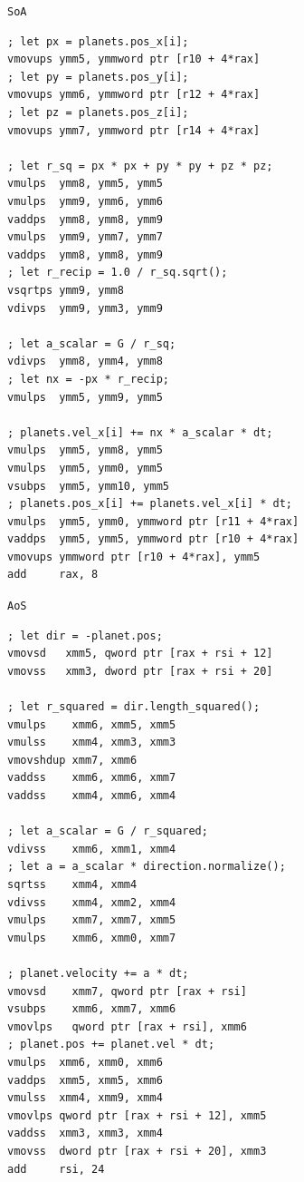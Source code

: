 \begin{figure}[htbp]
\centering
\begin{minipage}[t]{0.42\linewidth}
\centering\texttt{SoA}\par\smallskip
\begin{lstlisting}[language={[x86masm]Assembler}, basicstyle=\scriptsize\ttfamily]
; let px = planets.pos_x[i];
vmovups ymm5, ymmword ptr [r10 + 4*rax]
; let py = planets.pos_y[i];
vmovups ymm6, ymmword ptr [r12 + 4*rax]
; let pz = planets.pos_z[i];
vmovups ymm7, ymmword ptr [r14 + 4*rax]

; let r_sq = px * px + py * py + pz * pz;
vmulps  ymm8, ymm5, ymm5
vmulps  ymm9, ymm6, ymm6
vaddps  ymm8, ymm8, ymm9
vmulps  ymm9, ymm7, ymm7
vaddps  ymm8, ymm8, ymm9
; let r_recip = 1.0 / r_sq.sqrt();
vsqrtps ymm9, ymm8
vdivps  ymm9, ymm3, ymm9

; let a_scalar = G / r_sq;
vdivps  ymm8, ymm4, ymm8
; let nx = -px * r_recip;
vmulps  ymm5, ymm9, ymm5

; planets.vel_x[i] += nx * a_scalar * dt;
vmulps  ymm5, ymm8, ymm5
vmulps  ymm5, ymm0, ymm5
vsubps  ymm5, ymm10, ymm5
; planets.pos_x[i] += planets.vel_x[i] * dt;
vmulps  ymm5, ymm0, ymmword ptr [r11 + 4*rax]
vaddps  ymm5, ymm5, ymmword ptr [r10 + 4*rax]
vmovups ymmword ptr [r10 + 4*rax], ymm5
add     rax, 8
\end{lstlisting}
\end{minipage}%
\hspace{3em}%
\begin{minipage}[t]{0.42\linewidth}
\centering\texttt{AoS}\par\smallskip
\begin{lstlisting}[language={[x86masm]Assembler}, basicstyle=\scriptsize\ttfamily]
; let dir = -planet.pos;
vmovsd   xmm5, qword ptr [rax + rsi + 12]
vmovss   xmm3, dword ptr [rax + rsi + 20]

; let r_squared = dir.length_squared();
vmulps    xmm6, xmm5, xmm5
vmulss    xmm4, xmm3, xmm3
vmovshdup xmm7, xmm6
vaddss    xmm6, xmm6, xmm7
vaddss    xmm4, xmm6, xmm4  

; let a_scalar = G / r_squared;
vdivss    xmm6, xmm1, xmm4
; let a = a_scalar * direction.normalize();
sqrtss    xmm4, xmm4
vdivss    xmm4, xmm2, xmm4
vmulps    xmm7, xmm7, xmm5
vmulps    xmm6, xmm0, xmm7

; planet.velocity += a * dt;
vmovsd    xmm7, qword ptr [rax + rsi]
vsubps    xmm6, xmm7, xmm6
vmovlps   qword ptr [rax + rsi], xmm6
; planet.pos += planet.vel * dt;
vmulps  xmm6, xmm0, xmm6
vaddps  xmm5, xmm5, xmm6
vmulss  xmm4, xmm9, xmm4
vmovlps qword ptr [rax + rsi + 12], xmm5
vaddss  xmm3, xmm3, xmm4
vmovss  dword ptr [rax + rsi + 20], xmm3
add     rsi, 24
\end{lstlisting}
\end{minipage}
\label{fig:s1:asm}
\end{figure}

